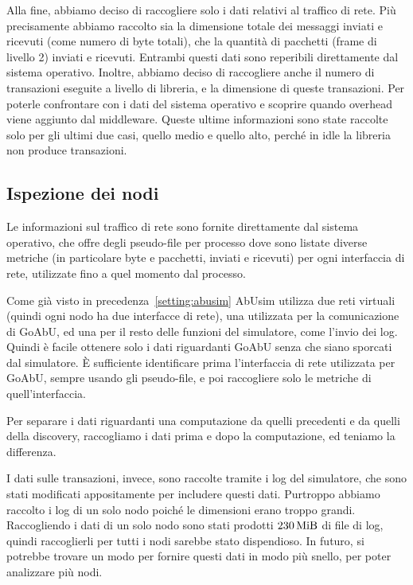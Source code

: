 \documentclass[12pt, a4paper]{article}
\begin{document}
Alla fine, abbiamo deciso di raccogliere solo i dati relativi al traffico di rete. Più precisamente abbiamo raccolto sia la dimensione totale dei messaggi inviati e ricevuti (come numero di byte totali), che la quantità di pacchetti (frame di livello 2) inviati e ricevuti. Entrambi questi dati sono reperibili direttamente dal sistema operativo.
Inoltre, abbiamo deciso di raccogliere anche il numero di transazioni eseguite a livello di libreria, e la dimensione di queste transazioni. Per poterle confrontare con i dati del sistema operativo e scoprire quando overhead viene aggiunto dal middleware.
Queste ultime informazioni sono state raccolte solo per gli ultimi due casi, quello medio e quello alto, perché in idle la libreria non produce transazioni.

\subsection{Ispezione dei nodi}

Le informazioni sul traffico di rete sono fornite direttamente dal sistema operativo, che offre degli pseudo-file per processo dove sono listate diverse metriche (in particolare byte e pacchetti, inviati e ricevuti) per ogni interfaccia di rete, utilizzate fino a quel momento dal processo.

Come già visto in precedenza~\ref{setting:abusim} AbUsim utilizza due reti virtuali (quindi ogni nodo ha due interfacce di rete), una utilizzata per la comunicazione di GoAbU, ed una per il resto delle funzioni del simulatore, come l'invio dei log.
Quindi è facile ottenere solo i dati riguardanti GoAbU senza che siano sporcati dal simulatore. È sufficiente identificare prima l'interfaccia di rete utilizzata per GoAbU, sempre usando gli pseudo-file, e poi raccogliere solo le metriche di quell'interfaccia.

Per separare i dati riguardanti una computazione da quelli precedenti e da quelli della discovery, raccogliamo i dati prima e dopo la computazione, ed teniamo la differenza.

I dati sulle transazioni, invece, sono raccolte tramite i log del simulatore, che sono stati modificati appositamente per includere questi dati.
Purtroppo abbiamo raccolto i log di un solo nodo poiché le dimensioni erano troppo grandi. Raccogliendo i dati di un solo nodo sono stati prodotti $\qty{230}{\mebi\byte}$ di file di log, quindi raccoglierli per tutti i nodi sarebbe stato dispendioso.
In futuro, si potrebbe trovare un modo per fornire questi dati in modo più snello, per poter analizzare più nodi.
\end{document}
